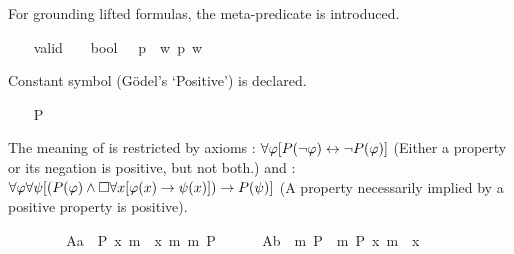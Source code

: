 \begin{isabellebody}
\begin{isamarkuptext}%
For grounding lifted formulas, the meta-predicate  is introduced.%
\end{isamarkuptext}%
\isamarkuptrue%
\ \ \isamarkupfalse%
\ valid\ {\isacharcolon}{\isacharcolon}\ {\isachardoublequoteopen}{\isasymsigma}\ {\isasymRightarrow}\ bool{\isachardoublequoteclose}\ {\isacharparenleft}{\isachardoublequoteopen}{\isacharbrackleft}{\isacharunderscore}{\isacharbrackright}{\isachardoublequoteclose}{\isacharparenright}\ \ {\isachardoublequoteopen}{\isacharbrackleft}p{\isacharbrackright}\ {\isasymequiv}\ {\isasymforall}w{\isachardot}\ p\ w{\isachardoublequoteclose}%
\isamarkuptrue%
%
\begin{isamarkuptext}%
Constant symbol  (G\"odel's `Positive') is declared.%
\end{isamarkuptext}%
\isamarkuptrue%
\ \ \isamarkupfalse%
\ P\ {\isacharcolon}{\isacharcolon}\ {\isachardoublequoteopen}{\isacharparenleft}{\isasymmu}\ {\isasymRightarrow}\ {\isasymsigma}{\isacharparenright}\ {\isasymRightarrow}\ {\isasymsigma}{\isachardoublequoteclose}%
\begin{isamarkuptext}%
The meaning of  is restricted by axioms : $\forall \varphi 
[P(\neg \varphi) \leftrightarrow \neg P(\varphi)]$ (Either a property or its negation is positive, but not both.) 
and : $\forall \varphi \forall \psi [(P(\varphi) \wedge \Box \forall x [\varphi(x) \rightarrow \psi(x)]) 
\rightarrow P(\psi)]$ (A property necessarily implied by a positive property is positive).%
\end{isamarkuptext}%
\isamarkuptrue%
\ \ \isamarkupfalse%
\ \isanewline
\ \ \ \ A{}a{\isacharcolon}\ {\isachardoublequoteopen}{\isacharbrackleft}{\isasymforall}{\isacharparenleft}{\isasymlambda}{\isasymphi}{\isachardot}\ P\ {\isacharparenleft}{\isasymlambda}x{\isachardot}\ m{\isasymnot}\ {\isacharparenleft}{\isasymphi}\ x{\isacharparenright}{\isacharparenright}\ m{\isasymrightarrow}\ m{\isasymnot}\ {\isacharparenleft}P\ {\isasymphi}{\isacharparenright}{\isacharparenright}{\isacharbrackright}{\isachardoublequoteclose}\ \isanewline
\ \ \ \ A{}b{\isacharcolon}\ {\isachardoublequoteopen}{\isacharbrackleft}{\isasymforall}{\isacharparenleft}{\isasymlambda}{\isasymphi}{\isachardot}\ m{\isasymnot}\ {\isacharparenleft}P\ {\isasymphi}{\isacharparenright}\ m{\isasymrightarrow}\ P\ {\isacharparenleft}{\isasymlambda}x{\isachardot}\ m{\isasymnot}\ {\isacharparenleft}{\isasymphi}\ x{\isacharparenright}{\isacharparenright}{\isacharparenright}{\isacharbrackright}{\isachardoublequoteclose}\ \isanewline

\end{isabellebody}
